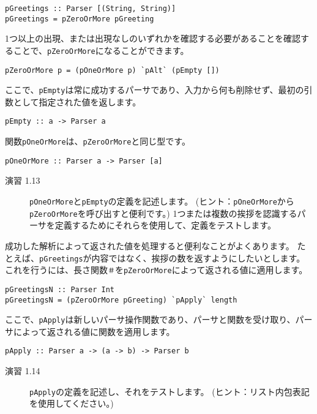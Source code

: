 \documentclass{jarticle}
\begin{document}
\begin{verbatim}
pGreetings :: Parser [(String, String)]
pGreetings = pZeroOrMore pGreeting
\end{verbatim}

1つ以上の出現、または出現なしのいずれかを確認する必要があることを確認することで、\texttt{pZeroOrMore}になることができます。

\begin{verbatim}
pZeroOrMore p = (pOneOrMore p) `pAlt` (pEmpty [])
\end{verbatim}

ここで、\texttt{pEmpty}は常に成功するパーサであり、入力から何も削除せず、最初の引数として指定された値を返します。

\begin{verbatim}
pEmpty :: a -> Parser a
\end{verbatim}

関数\texttt{pOneOrMore}は、\texttt{pZeroOrMore}と同じ型です。

\begin{verbatim}
pOneOrMore :: Parser a -> Parser [a]
\end{verbatim}

\begin{description}
	\item[演習 1.13] \texttt{pOneOrMore}と\texttt{pEmpty}の定義を記述します。
	      (ヒント：\texttt{pOneOrMore}から\texttt{pZeroOrMore}を呼び出すと便利です。)
	      1つまたは複数の挨拶を認識するパーサを定義するためにそれらを使用して、定義をテストします。
\end{description}

成功した解析によって返された値を処理すると便利なことがよくあります。
たとえば、\texttt{pGreetings}が内容ではなく、挨拶の数を返すようにしたいとします。
これを行うには、長さ関数\texttt{＃}を\texttt{pZeroOrMore}によって返される値に適用します。

\begin{verbatim}
pGreetingsN :: Parser Int
pGreetingsN = (pZeroOrMore pGreeting) `pApply` length
\end{verbatim}

ここで、\texttt{pApply}は新しいパーサ操作関数であり、パーサと関数を受け取り、パーサによって返される値に関数を適用します。

\begin{verbatim}
pApply :: Parser a -> (a -> b) -> Parser b
\end{verbatim}

\begin{description}
	\item[演習 1.14] \texttt{pApply}の定義を記述し、それをテストします。
	      (ヒント：リスト内包表記を使用してください。)
\end{description}
\end{document}
